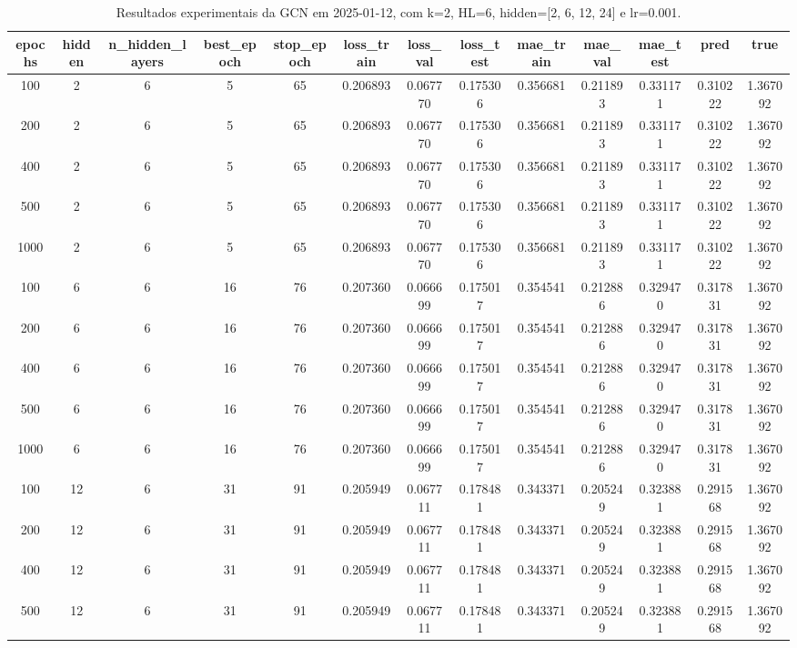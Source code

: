 \begin{table}[h]
\centering
\caption{Resultados experimentais da GCN em 2025-01-12, com k=2, HL=6, hidden=[2, 6, 12, 24] e lr=0.001.}
\label{tab:gcn_results_k2_hl6_d20250112}
\begin{tabular}{ccccccccccccc}
\toprule
epochs & hidden & n\_hidden\_layers & best\_epoch & stop\_epoch & loss\_train & loss\_val & loss\_test & mae\_train & mae\_val & mae\_test & pred & true \\
\midrule
100 & 2 & 6 & 5 & 65 & 0.206893 & 0.067770 & 0.175306 & 0.356681 & 0.211893 & 0.331171 & 0.310222 & 1.367092 \\
200 & 2 & 6 & 5 & 65 & 0.206893 & 0.067770 & 0.175306 & 0.356681 & 0.211893 & 0.331171 & 0.310222 & 1.367092 \\
400 & 2 & 6 & 5 & 65 & 0.206893 & 0.067770 & 0.175306 & 0.356681 & 0.211893 & 0.331171 & 0.310222 & 1.367092 \\
500 & 2 & 6 & 5 & 65 & 0.206893 & 0.067770 & 0.175306 & 0.356681 & 0.211893 & 0.331171 & 0.310222 & 1.367092 \\
1000 & 2 & 6 & 5 & 65 & 0.206893 & 0.067770 & 0.175306 & 0.356681 & 0.211893 & 0.331171 & 0.310222 & 1.367092 \\
100 & 6 & 6 & 16 & 76 & 0.207360 & 0.066699 & 0.175017 & 0.354541 & 0.212886 & 0.329470 & 0.317831 & 1.367092 \\
200 & 6 & 6 & 16 & 76 & 0.207360 & 0.066699 & 0.175017 & 0.354541 & 0.212886 & 0.329470 & 0.317831 & 1.367092 \\
400 & 6 & 6 & 16 & 76 & 0.207360 & 0.066699 & 0.175017 & 0.354541 & 0.212886 & 0.329470 & 0.317831 & 1.367092 \\
500 & 6 & 6 & 16 & 76 & 0.207360 & 0.066699 & 0.175017 & 0.354541 & 0.212886 & 0.329470 & 0.317831 & 1.367092 \\
1000 & 6 & 6 & 16 & 76 & 0.207360 & 0.066699 & 0.175017 & 0.354541 & 0.212886 & 0.329470 & 0.317831 & 1.367092 \\
100 & 12 & 6 & 31 & 91 & 0.205949 & 0.067711 & 0.178481 & 0.343371 & 0.205249 & 0.323881 & 0.291568 & 1.367092 \\
200 & 12 & 6 & 31 & 91 & 0.205949 & 0.067711 & 0.178481 & 0.343371 & 0.205249 & 0.323881 & 0.291568 & 1.367092 \\
400 & 12 & 6 & 31 & 91 & 0.205949 & 0.067711 & 0.178481 & 0.343371 & 0.205249 & 0.323881 & 0.291568 & 1.367092 \\
500 & 12 & 6 & 31 & 91 & 0.205949 & 0.067711 & 0.178481 & 0.343371 & 0.205249 & 0.323881 & 0.291568 & 1.367092 \\

\end{tabular}
\end{table}
